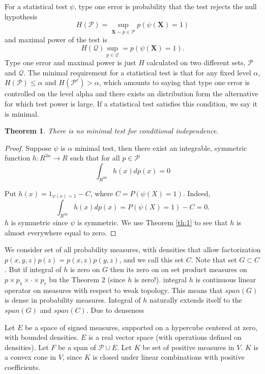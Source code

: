\documentclass{article}
\newtheorem{Theorem}{Theorem}
\begin{document}
For a statistical test $\psi$, type one error is probability that the test rejects the null hypothesis 
\[
 H(\mathcal{P}) =  \sup_{\mathbf{X} \sim p \in \mathcal{P} }   p( \psi(\mathbf X) =1 )
\]
and maximal power of the test is 
\[
H(\mathcal{Q}) \sup_{p \in \mathcal{Q} }  = p( \psi(\mathbf X) =1 ).
\]
Type one error and maximal power is just $H$  calculated on two different sets,  $\mathcal{P}$ and $\mathcal{Q}$. The minimal requirement for a statistical test is that for any fixed level $\alpha$, $H(\mathcal{P}) \leq \alpha$ and $H(\mathcal{P}^c) > \alpha$, which amounts to saying that type one error is controlled on the level alpha and there exists an distribution form the alternative for which test power is large. If a statistical test satisfies this condition, we say it is minimal. 
\begin{Theorem}
 There is no minimal test for conditional independence.
\end{Theorem}

\begin{proof}
Suppose  $\psi$ is $\alpha$ minimal test, then there exist an integrable, symmetric function $h: R^{3n} \to R$ such that for all $p \in \mathcal{P}$ 
\[
 \int_{R^{3n}} h(x) dp(x) = 0
\]

Put $h(x) = 1_{\psi(x) =1 } - C$, where $C = P( \psi(X) =1)$. Indeed, 
 \[
  \int_{R^{3n}} h(x) dp(x) = P( \psi(X) =1) - C = 0.
 \]
$h$ is symmetric since $\psi$ is symmetric. We use Theorem \ref{th:1} to see that $h$ is almost everywhere equal to zero.
\end{proof}

We consider set of all probability measures, with densities that allow factorization $p(x,y,z)p(z) = p(x,z)p(y,z)$, and we call this set $C$. Note that set $G \subset C$. But if integral of $h$ is zero on $G$ then its zero on on set product measures on $p \times p_1 \times \cdot \times p_r$ bu the Theorem 2 (since $h$ is zero!).  integral $h$ is continuous linear operator on measures with respect to weak topology. This means that $span(G)$ is dense in probability measures. Integral of $h$ naturally extends itself to the $span(G)$ and $span(C)$. Due to denseness  

Let $E$ be a space of signed measures, supported on a hypercube centered at zero, with bounded densities. $E$ is a real vector space (with operations defined on densities). Let $F$ be a span of $\mathcal P \cup E$. Let $K$ be set of positive measures in $V$. $K$ is a convex cone in $V$, since $K$ is closed under linear combinations with positive coefficients.
\end{document}
